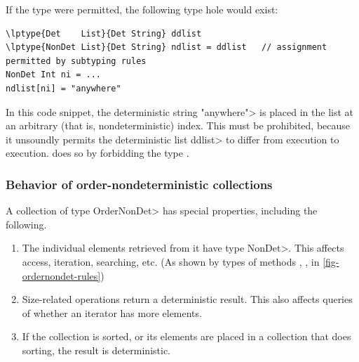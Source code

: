 
If the type  were
permitted, the following type hole would exist:

\begin{Verbatim}[commandchars=\\\{\}]
\lptype{Det    List}{Det String} ddlist
\lptype{NonDet List}{Det String} ndlist = ddlist   // assignment permitted by subtyping rules
NonDet Int ni = ...
ndlist[ni] = "anywhere"
\end{Verbatim}

\noindent
In this code snippet,
the deterministic string \<"anywhere"> is placed in the list at an
arbitrary (that is, nondeterministic) index.  This must be prohibited,
because it unsoundly permits the deterministic list \<ddlist> to differ
from execution to execution.  \OurTypeSystem does so by forbidding the type
.


\subsubsection{Behavior of order-nondeterministic collections}\label{sec:ond-behavior}

A collection of type \<OrderNonDet> has special properties, including the following.

\begin{enumerate}
\item
The individual elements retrieved from it have type \<NonDet>.  This
affects access, iteration, searching, etc.
(As shown by types of methods , ,  in \cref{fig-ordernondet-rules})
\item
Size-related operations return a deterministic result.  This also affects
queries of whether an iterator has more elements.
\item
If the collection is sorted, or its elements are placed in a collection
that does sorting, the result is deterministic.
\end{enumerate}

